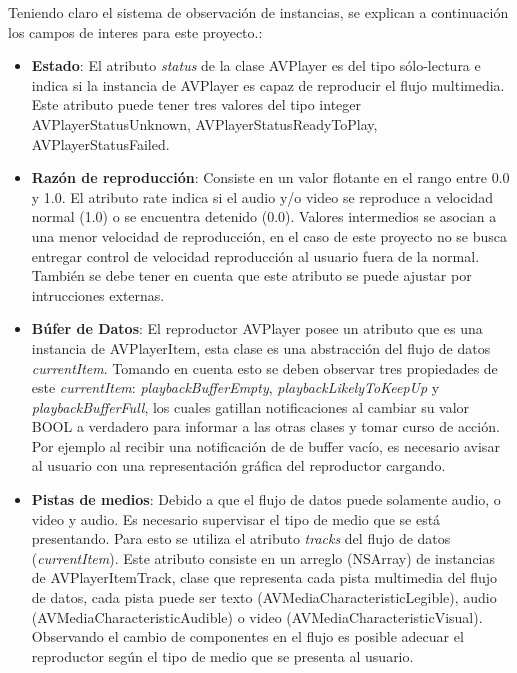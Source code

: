  
 Teniendo claro el sistema de observación de instancias, se explican a continuación los campos de interes para este proyecto.:
\begin{itemize}
\item \textbf{Estado}: El atributo \textit{status} de la clase AVPlayer es del tipo sólo-lectura e indica si la instancia de AVPlayer es capaz de reproducir el flujo multimedia. Este atributo puede tener tres valores del tipo integer AVPlayerStatusUnknown, AVPlayerStatusReadyToPlay, AVPlayerStatusFailed.

\item \textbf{Razón de reproducción}: Consiste en un valor flotante en el rango entre 0.0 y 1.0. El atributo rate indica si el audio y/o video se reproduce a velocidad normal (1.0) o se encuentra detenido (0.0). Valores intermedios se asocian a una menor velocidad de reproducción, en el caso de este proyecto no se busca entregar control de velocidad reproducción al usuario fuera de la normal. También se debe tener en cuenta que este atributo se puede ajustar por intrucciones externas.

\item \textbf{Búfer de Datos}: El reproductor AVPlayer posee un atributo que es una instancia de AVPlayerItem, esta clase es una abstracción del flujo de datos \textit{currentItem}. Tomando en cuenta esto se deben observar tres propiedades de este \textit{currentItem}: \textit{playbackBufferEmpty}, \textit{playbackLikelyToKeepUp} y \textit{playbackBufferFull}, los cuales  gatillan notificaciones al cambiar su valor BOOL a verdadero para informar a las otras clases y tomar curso de acción. Por ejemplo al recibir una notificación de de buffer vacío, es necesario avisar al usuario con una representación gráfica del reproductor cargando.

\item \textbf{Pistas de medios}: Debido a que el flujo de datos puede solamente audio, o video y audio. Es necesario supervisar el tipo de medio que se está presentando. Para esto se utiliza el atributo \textit{tracks} del flujo de datos (\textit{currentItem}). Este atributo consiste en un arreglo (NSArray) de instancias de AVPlayerItemTrack, clase que representa cada pista multimedia del flujo de datos, cada pista puede ser texto (AVMediaCharacteristicLegible), audio (AVMediaCharacteristicAudible) o video (AVMediaCharacteristicVisual). Observando el cambio de componentes en el flujo es posible adecuar el reproductor según el tipo de medio que se presenta al usuario.


\end{itemize}

